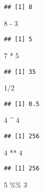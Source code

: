 \documentclass[
]{article}
\newenvironment{Shaded}{\begin{snugshade}}{\end{snugshade}}
\newcommand{\DecValTok}[1]{\textcolor[rgb]{0.00,0.00,0.81}{#1}}
\newcommand{\SpecialCharTok}[1]{\textcolor[rgb]{0.00,0.00,0.00}{#1}}
\begin{document}
\begin{verbatim}
## [1] 8
\end{verbatim}

\begin{Shaded}
\begin{Highlighting}[]
\DecValTok{8} \SpecialCharTok{{-}} \DecValTok{3}   
\end{Highlighting}
\end{Shaded}

\begin{verbatim}
## [1] 5
\end{verbatim}

\begin{Shaded}
\begin{Highlighting}[]
\DecValTok{7} \SpecialCharTok{*} \DecValTok{5}   
\end{Highlighting}
\end{Shaded}

\begin{verbatim}
## [1] 35
\end{verbatim}

\begin{Shaded}
\begin{Highlighting}[]
\DecValTok{1}\SpecialCharTok{/}\DecValTok{2}     
\end{Highlighting}
\end{Shaded}

\begin{verbatim}
## [1] 0.5
\end{verbatim}

\begin{Shaded}
\begin{Highlighting}[]
\DecValTok{4} \SpecialCharTok{\^{}} \DecValTok{4}   
\end{Highlighting}
\end{Shaded}

\begin{verbatim}
## [1] 256
\end{verbatim}

\begin{Shaded}
\begin{Highlighting}[]
\DecValTok{4} \SpecialCharTok{**} \DecValTok{4}  
\end{Highlighting}
\end{Shaded}

\begin{verbatim}
## [1] 256
\end{verbatim}

\begin{Shaded}
\begin{Highlighting}[]
\DecValTok{5} \SpecialCharTok{\%\%} \DecValTok{3}  
\end{Highlighting}
\end{Shaded}
\end{document}
